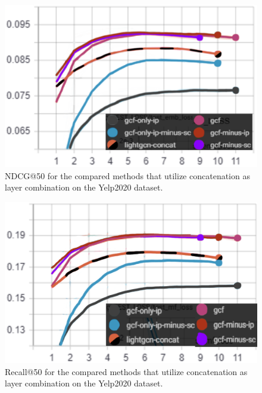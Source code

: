 \begin{figure}[h!]
    \includegraphics[width=\linewidth]{figures/gcf-ndcg-concat.png}
    \caption{NDCG@50 for the compared methods that utilize concatenation as layer combination on the Yelp2020 dataset.}
    \label{fig:GCF-NDCG-concat-ablation-study}
\end{figure}
\begin{figure}[h!]
    \includegraphics[width=\linewidth]{figures/gcf-concat-recall.png}
    \caption{Recall@50 for the compared methods that utilize concatenation as layer combination on the Yelp2020 dataset.}
    \label{fig:GCF-recall-concat-ablation-study}
\end{figure}
